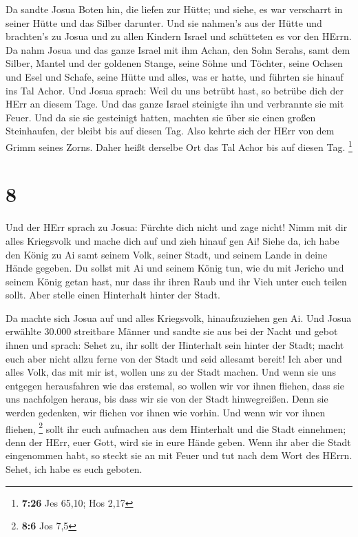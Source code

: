  Da sandte Josua Boten hin, die liefen zur Hütte; und
siehe, es war verscharrt in seiner Hütte und das Silber darunter.
 Und sie nahmen's aus der Hütte und brachten's zu Josua und
zu allen Kindern Israel und schütteten es vor den HErrn. 
Da nahm Josua und das ganze Israel mit ihm Achan, den Sohn Serahs, samt
dem Silber, Mantel und der goldenen Stange, seine Söhne und Töchter,
seine Ochsen und Esel und Schafe, seine Hütte und alles, was er hatte,
und führten sie hinauf ins Tal Achor.  Und Josua sprach:
Weil du uns betrübt hast, so betrübe dich der HErr an diesem Tage. Und
das ganze Israel steinigte ihn und verbrannte sie mit Feuer. Und da sie
sie gesteinigt hatten,  machten sie über sie einen großen
Steinhaufen, der bleibt bis auf diesen Tag. Also kehrte sich der HErr
von dem Grimm seines Zorns. Daher heißt derselbe Ort das Tal Achor bis
auf diesen Tag. \footnote{\textbf{7:26} Jes 65,10; Hos 2,17}

\hypertarget{section-2}{%
\section{8}\label{section-2}}

 Und der HErr sprach zu Josua: Fürchte dich nicht und zage
nicht! Nimm mit dir alles Kriegsvolk und mache dich auf und zieh hinauf
gen Ai! Siehe da, ich habe den König zu Ai samt seinem Volk, seiner
Stadt, und seinem Lande in deine Hände gegeben.  Du sollst
mit Ai und seinem König tun, wie du mit Jericho und seinem König getan
hast, nur dass ihr ihren Raub und ihr Vieh unter euch teilen sollt. Aber
stelle einen Hinterhalt hinter der Stadt.

 Da machte sich Josua auf und alles Kriegsvolk,
hinaufzuziehen gen Ai. Und Josua erwählte 30.000 streitbare Männer und
sandte sie aus bei der Nacht  und gebot ihnen und sprach:
Sehet zu, ihr sollt der Hinterhalt sein hinter der Stadt; macht euch
aber nicht allzu ferne von der Stadt und seid allesamt bereit!
 Ich aber und alles Volk, das mit mir ist, wollen uns zu der
Stadt machen. Und wenn sie uns entgegen herausfahren wie das erstemal,
so wollen wir vor ihnen fliehen,  dass sie uns nachfolgen
heraus, bis dass wir sie von der Stadt hinwegreißen. Denn sie werden
gedenken, wir fliehen vor ihnen wie vorhin. Und wenn wir vor ihnen
fliehen, \footnote{\textbf{8:6} Jos 7,5}  sollt ihr euch
aufmachen aus dem Hinterhalt und die Stadt einnehmen; denn der HErr,
euer Gott, wird sie in eure Hände geben.  Wenn ihr aber die
Stadt eingenommen habt, so steckt sie an mit Feuer und tut nach dem Wort
des HErrn. Sehet, ich habe es euch geboten.

